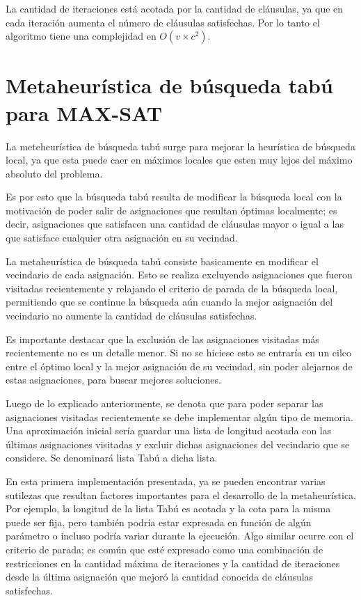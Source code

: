\documentclass[a4paper,10pt]{article}
\begin{document}
La cantidad de iteraciones está acotada por la cantidad de cláusulas, ya que en cada iteración aumenta el número de cláusulas satisfechas. Por lo tanto el algoritmo tiene una complejidad en $O\left( v \times c^2 \right)$.


\section*{Metaheur\'istica de b\'usqueda tab\'u para MAX-SAT}

La meteheur\'istica de b\'usqueda tab\'u surge para mejorar la heur\'istica de b\'usqueda local, ya que esta puede caer en m\'aximos locales que esten muy lejos del m\'aximo absoluto del problema.

Es por esto que la b\'usqueda tab\'u resulta de modificar la b\'usqueda local con la motivaci\'on de poder salir de asignaciones que resultan \'optimas localmente; es decir, asignaciones que satisfacen una cantidad de cl\'ausulas mayor o igual a las que satisface cualquier otra asignaci\'on en su vecindad.

La metaheur\'istica de b\'usqueda tab\'u consiste basicamente en modificar el vecindario de cada asignaci\'on. Esto se realiza excluyendo asignaciones que fueron visitadas recientemente y relajando el criterio de parada de la b\'usqueda local, permitiendo que se continue la b\'usqueda a\'un cuando la mejor asignaci\'on del vecindario no aumente la cantidad de cl\'ausulas satisfechas. 

Es importante destacar que la exclusi\'on de las asignaciones visitadas m\'as recientemente no es un detalle menor. Si no se hiciese esto se entrar\'ia en un cilco entre el \'optimo local y la mejor asignaci\'on de su vecindad, sin poder alejarnos de estas asignaciones, para buscar mejores soluciones.

Luego de lo explicado anteriormente, se denota que para poder separar las asignaciones visitadas recientemente se debe implementar alg\'un tipo de memoria. Una aproximaci\'on inicial ser\'ia guardar una lista de longitud acotada con las \'ultimas asignaciones visitadas y excluir dichas asignaciones del vecindario que se considere. Se denominar\'a lista Tab\'u a dicha lista.

En esta primera implementaci\'on presentada, ya se pueden encontrar varias sutilezas que resultan factores importantes para el desarrollo de la metaheur\'istica. Por ejemplo, la longitud de la lista Tab\'u es acotada y la cota para la misma puede ser fija, pero tambi\'en podr\'ia estar expresada en funci\'on de alg\'un par\'ametro o incluso podr\'ia variar durante la ejecuci\'on. Algo similar ocurre con el criterio de parada; es com\'un que est\'e expresado como una combinaci\'on de restricciones en la cantidad m\'axima de iteraciones y la cantidad de iteraciones desde la \'ultima asignaci\'on que mejor\'o la cantidad conocida de cl\'ausulas satisfechas.
\end{document}
